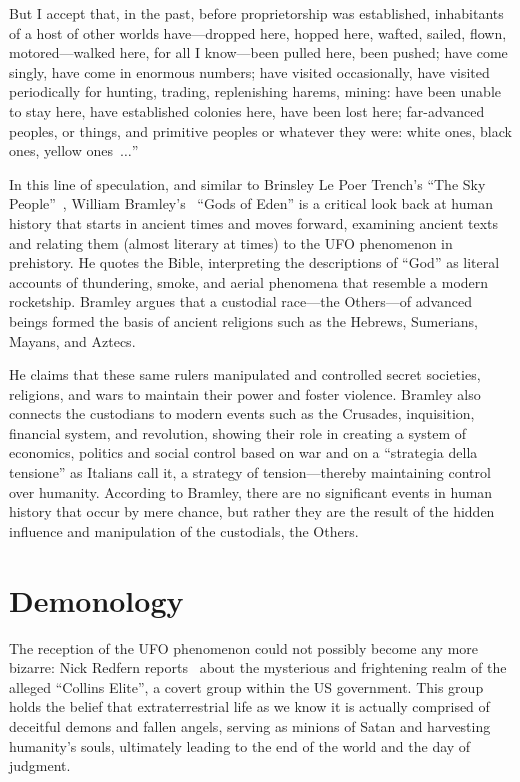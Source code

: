 \begin{svgraybox}
But I accept that, in the past, before proprietorship was established,
inhabitants of a host of other worlds have---dropped here, hopped here,
wafted, sailed, flown, motored---walked here, for all I know---been pulled here, been pushed;
have come singly, have come in enormous numbers; have visited occasionally,
 have visited periodically for hunting, trading, replenishing harems, mining:
have been unable to stay here, have established colonies here, have been lost here;
far-advanced peoples, or things, and primitive peoples or whatever they were:
white ones, black ones, yellow ones~$\ldots$''
\end{svgraybox}

In this line of speculation, and similar to Brinsley Le Poer Trench's
``The Sky People''~\cite{lePoerTrench1961Jan},
William Bramley's~\cite{Bramley1993Mar}  ``Gods of Eden''
is a critical look back at human history that starts in ancient
times and moves forward, examining ancient texts and relating them (almost literary at times) to the UFO phenomenon in prehistory.
He quotes the Bible, interpreting the descriptions of ``God'' as literal accounts of thundering,
smoke, and aerial phenomena that resemble a modern rocketship.
Bramley argues that a custodial race---the Others---of advanced beings formed the basis of ancient religions such as the
Hebrews, Sumerians, Mayans, and Aztecs.

He claims that these same rulers manipulated and controlled secret societies,
religions, and wars to maintain their power and foster violence.
Bramley also connects the custodians to modern events such as the Crusades,
inquisition, financial system, and revolution, showing their role in creating a system of economics, politics
and social control based on war and on a ``strategia della tensione''
as Italians call it, a strategy of tension---thereby maintaining control over humanity.
According to Bramley, there are no significant events in human history that occur by mere chance,
but rather they are the result of the hidden influence and manipulation of the custodials, the Others.


\section{Demonology}
\label{2023-UFO-part-Perception-abductions-dem}

The reception of the UFO phenomenon could not possibly become any more bizarre:
Nick Redfern reports~\cite{Redfern2010Aug,Heiser2010Nov} about the mysterious and frightening realm of the alleged ``Collins Elite'',
a covert group within the US government. This group holds the belief that extraterrestrial life as we know it is actually comprised of deceitful demons and fallen angels, serving as minions of Satan and harvesting humanity's souls,
ultimately leading to the end of the world and the day of judgment.

